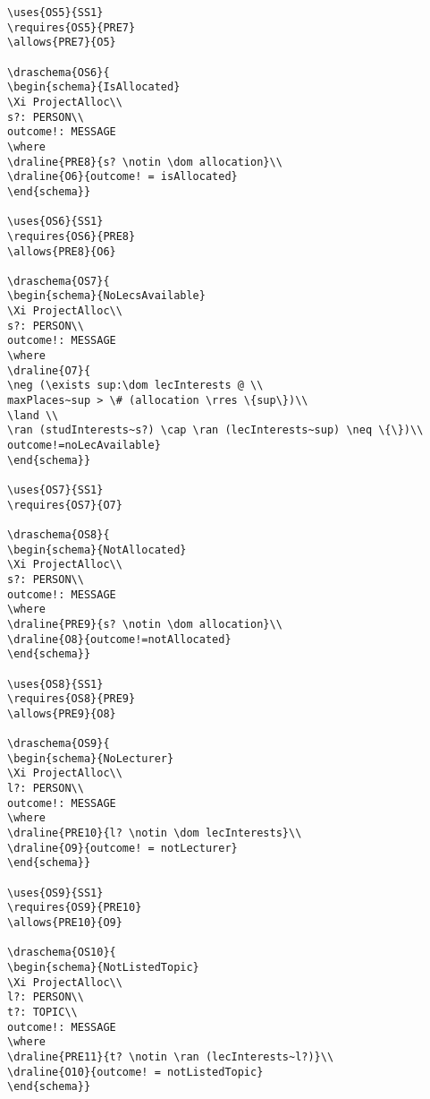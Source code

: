 \begin{verbatim}
\uses{OS5}{SS1}
\requires{OS5}{PRE7}
\allows{PRE7}{O5}

\draschema{OS6}{
\begin{schema}{IsAllocated}
\Xi ProjectAlloc\\
s?: PERSON\\
outcome!: MESSAGE
\where
\draline{PRE8}{s? \notin \dom allocation}\\
\draline{O6}{outcome! = isAllocated}
\end{schema}}

\uses{OS6}{SS1}
\requires{OS6}{PRE8}
\allows{PRE8}{O6}

\draschema{OS7}{
\begin{schema}{NoLecsAvailable}
\Xi ProjectAlloc\\
s?: PERSON\\
outcome!: MESSAGE
\where
\draline{O7}{
\neg (\exists sup:\dom lecInterests @ \\
maxPlaces~sup > \# (allocation \rres \{sup\})\\
\land \\
\ran (studInterests~s?) \cap \ran (lecInterests~sup) \neq \{\})\\
outcome!=noLecAvailable}
\end{schema}}

\uses{OS7}{SS1}
\requires{OS7}{O7}

\draschema{OS8}{
\begin{schema}{NotAllocated}
\Xi ProjectAlloc\\
s?: PERSON\\
outcome!: MESSAGE
\where
\draline{PRE9}{s? \notin \dom allocation}\\
\draline{O8}{outcome!=notAllocated}
\end{schema}}

\uses{OS8}{SS1}
\requires{OS8}{PRE9}
\allows{PRE9}{O8}

\draschema{OS9}{
\begin{schema}{NoLecturer}
\Xi ProjectAlloc\\
l?: PERSON\\
outcome!: MESSAGE
\where
\draline{PRE10}{l? \notin \dom lecInterests}\\
\draline{O9}{outcome! = notLecturer}
\end{schema}}

\uses{OS9}{SS1}
\requires{OS9}{PRE10}
\allows{PRE10}{O9}

\draschema{OS10}{
\begin{schema}{NotListedTopic}
\Xi ProjectAlloc\\
l?: PERSON\\
t?: TOPIC\\
outcome!: MESSAGE
\where
\draline{PRE11}{t? \notin \ran (lecInterests~l?)}\\
\draline{O10}{outcome! = notListedTopic}
\end{schema}}


\end{verbatim}
